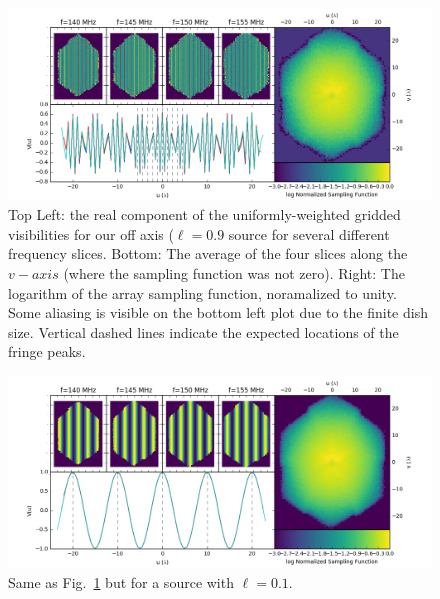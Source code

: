 \documentclass[a4paper,fleqn,usenatbib]{mnras}
\begin{document}
\begin{figure}
\includegraphics[width=\textwidth]{visPlot_217_perturbHex_100config_dAnt_2_dAntPos_3.png}
\caption{Top Left: the real component of the uniformly-weighted gridded visibilities for our off axis ($\ell=0.9$ source for several different frequency slices. Bottom: The average of the four slices along the $v-axis$ (where the sampling function was not zero). Right: The logarithm of the array sampling function, noramalized to unity. Some aliasing is visible on the bottom left plot due to the finite dish size. Vertical dashed lines indicate the expected locations of the fringe peaks.}
\label{fig:VisPlot_100Config}
\end{figure}

\begin{figure}
\includegraphics[width=\textwidth]{visPlot_offcenterleast_perturbHex_100config_dAnt_2_dAntPos_3.png}
\caption{Same as Fig.~\ref{fig:VisPlot_100Config} but for a source with $\ell=0.1$.}
\label{fig:VisPlot_100Config_nearZenith}
\end{figure}
\end{document}
